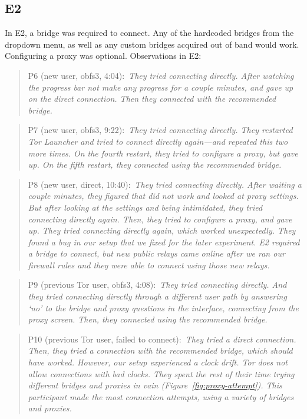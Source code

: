 \documentclass[USenglish,oneside,twocolumn]{article}
\newcommand{\pquote}[2]{
\begin{quotation}
\noindent #1:~\textit{#2}
\end{quotation}
}
\begin{document}
\subsection{E2} 
In E2, a bridge was required to connect. Any of the hardcoded bridges from the dropdown menu, as well as any custom bridges acquired out of band would work. Configuring a proxy was optional.
Observations in E2: 

\pquote{P6 (new user, obfs3, 4:04)}{They tried connecting directly. After watching the progress bar not make any progress for a couple minutes, and gave up on the direct connection. Then they connected with the recommended bridge.}

\pquote{P7 (new user, obfs3, 9:22)}{They tried connecting directly. They restarted Tor Launcher and tried to connect directly again---and repeated this two more times. On the fourth restart, they tried to configure a proxy, but gave up. On the fifth restart, they connected using the recommended bridge.}

\pquote{P8 (new user, direct, 10:40)}{They tried connecting directly. After waiting a couple minutes, they figured that did not work and looked at proxy settings. But after looking at the settings and being intimidated, they tried connecting directly again. Then, they tried to configure a proxy, and gave up. They tried connecting directly again, which worked unexpectedly. They found a bug in our setup that we fixed for the later experiment. E2 required a bridge to connect, but new public relays came online after we ran our firewall rules and they were able to connect using those new relays. }

\pquote{P9 (previous Tor user, obfs3, 4:08)}{They tried connecting directly. And they tried connecting directly through a different user path by answering `no' to the bridge and proxy questions in the interface, connecting from the proxy screen. Then, they connected using the recommended bridge.}

\pquote{P10 (previous Tor user, failed to connect)}{They tried a direct connection. Then, they tried a connection with the recommended bridge, which should have worked. However, our setup experienced a clock drift. Tor does not allow connections with bad clocks. They spent the rest of their time trying different bridges and proxies in vain (Figure~\ref{fig:proxy-attempt}). This participant made the most connection attempts, using a variety of bridges and proxies.}
\end{document}
